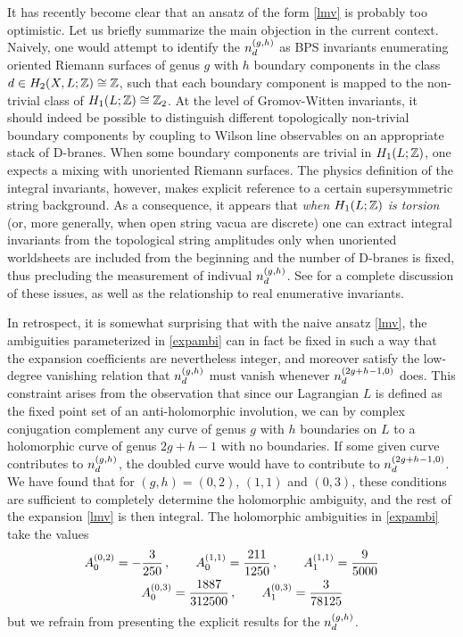 \medskip


\smallskip

\noindent It has recently become clear \cite{topor} that an ansatz of the form \eqref{lmv} is 
probably too optimistic. Let us briefly summarize the main objection in the
current context. Naively, one would attempt to identify the
$n^{(g,h)}_d$ as BPS invariants enumerating oriented Riemann surfaces of 
genus $g$ with $h$ boundary components in the class $d\in H_2(X,L;{\mathbb Z})
\cong{\mathbb Z}$, such that each boundary component is mapped to the non-trivial 
class of $H_1(L;{\mathbb Z})\cong{\mathbb Z}_2$. At the level of Gromov-Witten invariants,
it should indeed be possible to distinguish different topologically non-trivial
boundary components by coupling to Wilson line observables on an appropriate
stack of D-branes. When some boundary components are trivial in $H_1(L;{\mathbb Z})$, 
one expects a mixing with unoriented Riemann surfaces. The physics definition of
the integral invariants, however, makes explicit reference to a certain 
supersymmetric string background. As a consequence, it appears that {\it when 
$H_1(L;{\mathbb Z})$ is torsion} (or, more generally, when open string vacua are discrete)
one can extract integral invariants from the topological string amplitudes
only when unoriented worldsheets are included from the beginning and the number
of D-branes is fixed, thus precluding the measurement of indivual $n^{(g,h)}_d$. See 
\cite{topor} for a complete discussion of these issues, as well as the
relationship to real enumerative invariants.

In retrospect, it is somewhat surprising that with the naive ansatz \eqref{lmv},
the ambiguities parameterized in \eqref{expambi} can in fact be fixed in such a 
way that the expansion coefficients are nevertheless integer, and moreover
satisfy the low-degree vanishing relation that $n^{(g,h)}_d$ must vanish whenever 
$n^{(2g+h-1,0)}_{d}$ does. This constraint arises from the observation that
since our Lagrangian $L$ is defined as the fixed point set of an anti-holomorphic 
involution, we can by complex conjugation complement any curve of genus $g$ 
with $h$ boundaries on $L$ to a holomorphic curve of genus $2g+h-1$ with no 
boundaries. If some given curve contributes to $n^{(g,h)}_d$, the doubled 
curve would have to contribute to $n^{(2g+h-1,0)}_{d}$. We have found that for 
$(g,h)=(0,2)$, $(1,1)$ and $(0,3)$, these conditions are sufficient to 
completely determine the holomorphic ambiguity, and the rest of the expansion 
\eqref{lmv} is then integral. The holomorphic ambiguities in \eqref{expambi} 
take the values
\begin{equation}
\eqlabel{values}
\begin{split}
\A 020 =  - &\frac 3{250}\,,\qquad
\A 110 = \frac{211}{1250} \,,\qquad
\A 111 = \frac{9}{5000}
\\
&\A 030 = \frac{1887}{312500}\,,\qquad
\A 031 = \frac{3}{78125}
\end{split}
\end{equation}
but we refrain from presenting the explicit results for the $n^{(g,h)}_d$.

